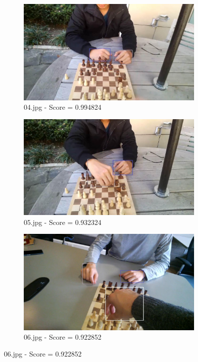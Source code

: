 \begin{figure}[!h]
\begin{subfigure}[b]{0.3\textwidth}
    \end{subfigure}

    \begin{subfigure}[b]{0.3 \textwidth}
        \centering
        \includegraphics[width=\textwidth]{images/handDetection/04.jpg}
        \caption{04.jpg - Score = 0.994824}
       
    \end{subfigure}
    \hfill
    \begin{subfigure}[b]{0.3\textwidth}
        \centering
        \includegraphics[width=\textwidth]{images/handDetection/05.jpg}
        \caption{05.jpg - Score = 0.932324}
        
    \end{subfigure}
    \hfill
    \begin{subfigure}[b]{0.3\textwidth}
        \centering
        \includegraphics[width=\textwidth]{images/handDetection/06.jpg}
        \caption{06.jpg - Score = 0.922852}
        

\end{subfigure}
\end{figure}
